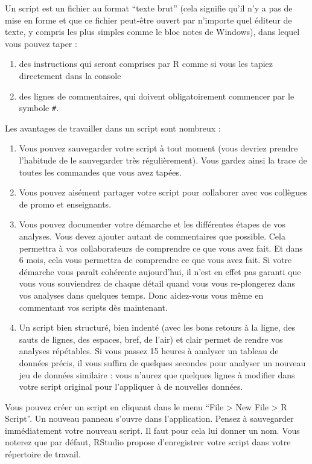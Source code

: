 \documentclass[
  a4paper,
]{article}
\providecommand{\tightlist}{%
  \setlength{\itemsep}{0pt}\setlength{\parskip}{0pt}}
\begin{document}
Un script est un fichier au format ``texte brut'' (cela signifie qu'il n'y a pas de mise en forme et que ce fichier peut-être ouvert par n'importe quel éditeur de texte, y compris les plus simples comme le bloc notes de Windows), dans lequel vous pouvez taper :

\begin{enumerate}
\def\labelenumi{\arabic{enumi}.}
\tightlist
\item
  des instructions qui seront comprises par R comme si vous les tapiez directement dans la console
\item
  des lignes de commentaires, qui doivent obligatoirement commencer par le symbole \texttt{\#}.
\end{enumerate}

Les avantages de travailler dans un script sont nombreux :

\begin{enumerate}
\def\labelenumi{\arabic{enumi}.}
\tightlist
\item
  Vous pouvez sauvegarder votre script à tout moment (vous devriez prendre l'habitude de le sauvegarder très régulièrement). Vous gardez ainsi la trace de toutes les commandes que vous avez tapées.
\item
  Vous pouvez aisément partager votre script pour collaborer avec vos collègues de promo et enseignants.
\item
  Vous pouvez documenter votre démarche et les différentes étapes de vos analyses. Vous devez ajouter autant de commentaires que possible. Cela permettra à vos collaborateurs de comprendre ce que vous avez fait. Et dans 6 mois, cela vous permettra de comprendre ce que vous avez fait. Si votre démarche vous paraît cohérente aujourd'hui, il n'est en effet pas garanti que vous vous souviendrez de chaque détail quand vous vous re-plongerez dans vos analyses dans quelques temps. Donc aidez-vous vous même en commentant vos scripts dès maintenant.
\item
  Un script bien structuré, bien indenté (avec les bons retours à la ligne, des sauts de lignes, des espaces, bref, de l'air) et clair permet de rendre vos analyses répétables. Si vous passez 15 heures à analyser un tableau de données précis, il vous suffira de quelques secondes pour analyser un nouveau jeu de données similaire : vous n'aurez que quelques lignes à modifier dans votre script original pour l'appliquer à de nouvelles données.
\end{enumerate}

Vous pouvez créer un script en cliquant dans le menu ``File \textgreater{} New File \textgreater{} R Script''. Un nouveau panneau s'ouvre dans l'application. Pensez à sauvegarder immédiatement votre nouveau script. Il faut pour cela lui donner un nom. Vous noterez que par défaut, RStudio propose d'enregistrer votre script dans votre répertoire de travail.
\end{document}
